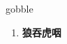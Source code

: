 
\begin{frame}
{\huge gobble}
\begin{center}
\begin{enumerate}\Large
  \item \textbf{狼吞虎咽}
\end{enumerate}
\end{center}
\end{frame}
